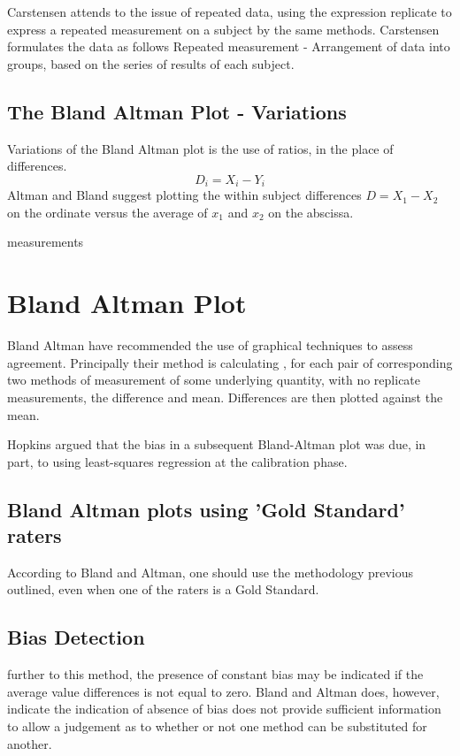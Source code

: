 \documentclass[12pt, a4paper]{report}
\theoremstyle{plain}
\theoremstyle{definition}
\theoremstyle{remark}
\begin{document}
	Carstensen attends to the issue of repeated data, using the
	expression replicate to express a repeated measurement on a
	subject by the same methods. Carstensen formulates the data as
	follows Repeated measurement - Arrangement of data into groups,
	based on the series of results of each subject.
	
	\subsection{The Bland Altman Plot - Variations}
	Variations of the Bland Altman plot is the use of ratios, in the
	place of differences.
	\begin{equation}
	D_{i} = X_{i} - Y_{i}   \label{BA01}
	\end{equation}
	Altman and Bland suggest plotting the within subject differences $
	D = X_{1} - X_{2} $ on the ordinate versus the average of $x_{1}$
	and  $x_{2}$ on the abscissa.

	measurements\section{Bland Altman Plot} Bland Altman have
	recommended the use of graphical techniques to assess agreement.
	Principally their method is calculating , for each pair of
	corresponding two methods of measurement of some underlying
	quantity, with no replicate measurements, the difference and mean.
	Differences are then plotted against the mean.
	
	
	Hopkins argued that the bias in a subsequent Bland-Altman plot was
	due, in part, to using least-squares regression at the calibration
	phase.
	
	\subsection{Bland Altman plots using 'Gold Standard' raters}
	According to Bland and Altman, one should use the methodology
	previous outlined, even when one of the raters is a Gold Standard.
	
	
	\subsection{Bias Detection}
	further to this method, the presence of constant bias may be
	indicated if the average value differences is not equal to zero.
	Bland and Altman does, however, indicate the indication of absence
	of bias does not provide sufficient information to allow a
	judgement as to whether or not one method can be substituted for
	another.
	
\end{document}
